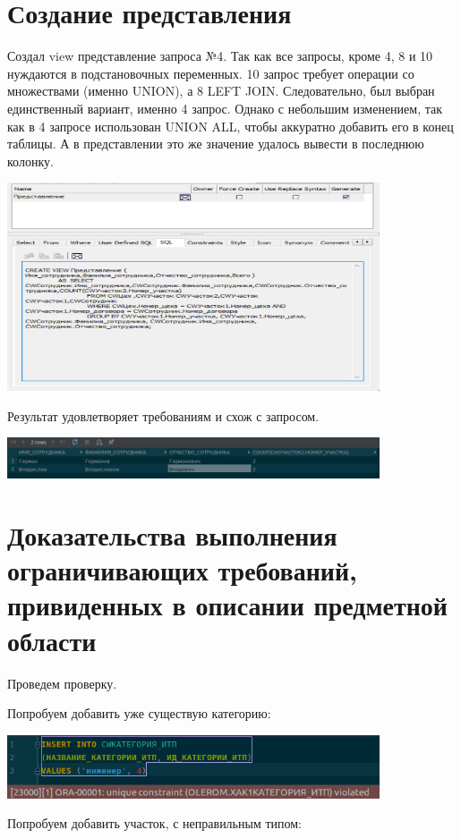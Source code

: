 \section{Создание представления}
Создал view представление запроса №4.
Так как все запросы, кроме 4, 8 и 10 нуждаются в подстановочных переменных.
10 запрос требует операции со множествами (именно UNION), а 8 LEFT JOIN.
Следовательно, был выбран единственный вариант, именно 4 запрос.
Однако с небольшим изменением, так как в 4 запросе использован UNION ALL, чтобы аккуратно добавить его в конец таблицы.
А в представлении это же значение удалось вывести в последнюю колонку.

\includegraphics[width=11cm]{./screenshots/view/sql.png}

Результат удовлетворяет требованиям и схож с запросом.

\includegraphics[width=11cm]{./screenshots/view/result.png}

\section{Доказательства выполнения ограничивающих требований, привиденных в описании предметной области}

Проведем проверку.

Попробуем добавить уже существую категорию:

\includegraphics[width=11cm]{./screenshots/constraints/cat_itp.png}

Попробуем добавить участок, с неправильным типом:

